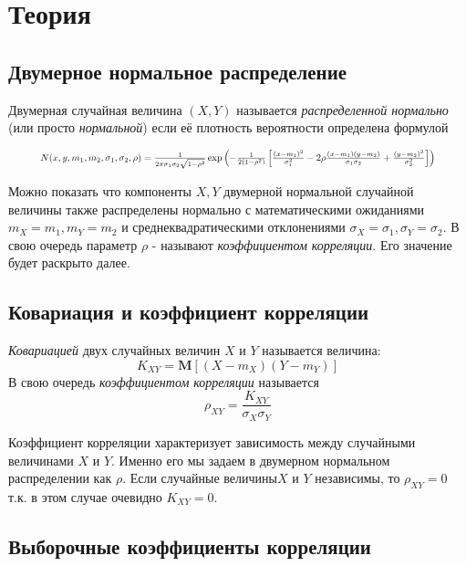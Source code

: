 \documentclass[12pt,a4paper]{article}
\begin{document}
\section{Теория}
\subsection{Двумерное нормальное распределение}
Двумерная случайная величина $(X,Y)$ называется \textit{распределенной нормально} (или просто \textit{нормальной}) если её плотность вероятности определена формулой

\begin{equation}
\resizebox{.9\hsize}{!}{$
	N(x, y, m_1, m_2, \sigma_1, \sigma_2, \rho) = \frac{1}{2\pi\sigma_1\sigma_2\sqrt{1-\rho^2}}
	\exp{
		\left(-\frac{1}{2(1-\rho^2)} 
		\left[\frac{(x - m_1)^2}{\sigma_1^2} -
		2\rho\frac{(x - m_1)(y - m_2)}{\sigma_1\sigma_2} +
		\frac{(y - m_2)^2}{\sigma_2^2}\right]\right)
	}$}\label{eq:1}
\end{equation}

Можно показать \cite[стр. 133-134]{verrazdely} что компоненты $X,Y$ двумерной нормальной случайной величины также распределены нормально с математическими ожиданиями $m_X = m_1, m_Y = m_2$ и среднеквадратическими отклонениями $\sigma_X = \sigma_1, \sigma_Y = \sigma_2$. В свою очередь параметр $\rho$ - называют \textit{коэффициентом корреляции}. Его значение будет раскрыто далее.

\subsection{Ковариация и коэффициент корреляции}
\textit{Ковариацией} двух случайных величин $X$ и $Y$ называется величина:
\begin{equation}
	K_{XY} = \textbf{M} \left[ (X-m_X)(Y-m_Y) \right]
\end{equation}
В свою очередь \textit{коэффициентом корреляции} называется
\begin{equation}
	\rho_{XY} = \frac{K_{XY}}{\sigma_X \sigma_Y}
\end{equation}

Коэффициент корреляции характеризует зависимость между случайными величинами $X$ и $Y$. Именно его мы задаем в двумерном нормальном распределении как $\rho$. Если случайные величины$X$ и $Y$  независимы, то $\rho_{XY} = 0$ т.к. в этом случае очевидно $K_{XY} = 0$.

\subsection{Выборочные коэффициенты корреляции}
\end{document}
